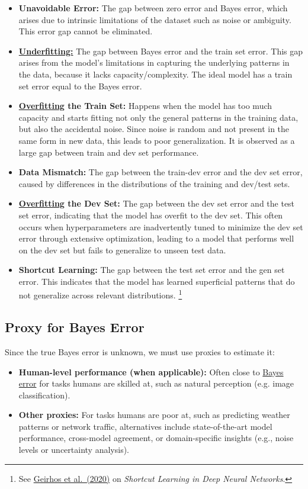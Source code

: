\documentclass[12pt,openany, draft]{book}
\begin{document}
\begin{itemize}
    \item \textbf{Unavoidable Error:} The gap between zero error and Bayes error, which arises due to intrinsic limitations of the dataset such as noise or ambiguity. This error gap cannot be eliminated.
    \item \textbf{\hyperref[subsec:underfitting]{Underfitting:}} The gap between Bayes error and the train set error. This gap arises from the model's limitations in capturing the underlying patterns in the data, because it lacks capacity/complexity. The ideal model has a train set error equal to the Bayes error.
    \item \textbf{\hyperref[subsec:overfitting]{Overfitting} the Train Set:}
     Happens when the model has too much capacity and starts fitting not only the general patterns in the training data, but also the accidental noise. Since noise is random and not present in the same form in new data, this leads to poor generalization. It is observed as a large gap between train and dev set performance.
    \item \textbf{Data Mismatch:} The gap between the train-dev error and the dev set error, caused by differences in the distributions of the training and dev/test sets.
    \item \textbf{\hyperref[subsec:overfitting]{Overfitting} the Dev Set:}
     The gap between the dev set error and the test set error, indicating that the model has overfit to the dev set. This often occurs when hyperparameters are inadvertently tuned to minimize the dev set error through extensive optimization, leading to a model that performs well on the dev set but fails to generalize to unseen test data.
    \item \textbf{Shortcut Learning:} The gap between the test set error and the gen set error. This indicates that the model has learned superficial patterns that do not generalize across relevant distributions. \footnote{See \href{https://doi.org/10.1038/s42256-020-00257-z}{Geirhos et al.\ (2020)} on \textit{Shortcut Learning in Deep Neural Networks}.}
\end{itemize}


\subsection{Proxy for Bayes Error} \label{subsec:proxy-for-bayes-error}
Since the true Bayes error is unknown, we must use proxies to estimate it:
\begin{itemize}
    \item \textbf{Human-level performance (when applicable):} Often close to \hyperref[subsec:Bayes_error]{Bayes error} for tasks humans are skilled at, such as natural perception (e.g. image classification).
    \item \textbf{Other proxies:} For tasks humans are poor at, such as predicting weather patterns or network traffic, alternatives include state-of-the-art model performance, cross-model agreement, or domain-specific insights (e.g., noise levels or uncertainty analysis). 
\end{itemize} 
\end{document}
